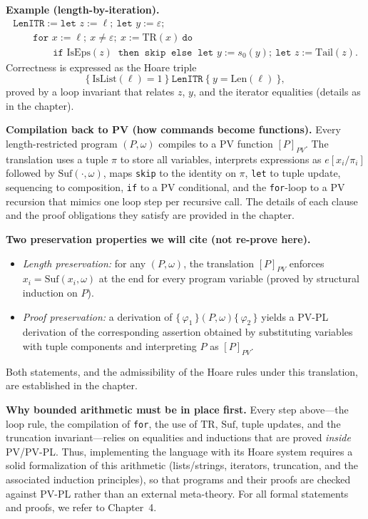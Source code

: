 \medskip
\noindent\textbf{Example (length-by-iteration).}
\[
\begin{array}{l}
\texttt{LenITR} := \texttt{let } z := \ell;\ \texttt{let } y := \varepsilon; \\[0.2em]
\qquad \texttt{for } x := \ell;\ x \neq \varepsilon;\ x := \mathrm{TR}(x)\ \texttt{do } \\
\qquad\qquad \texttt{if } \mathrm{IsEps}(z)\ \texttt{ then }\ \texttt{skip}\ \texttt{ else }\ \texttt{let } y := s_0(y);\ \texttt{let } z := \mathrm{Tail}(z).
\end{array}
\]
Correctness is expressed as the Hoare triple
\[
\{\ \mathrm{IsList}(\ell)=1\ \}\ \texttt{LenITR}\ \{\ y = \mathrm{Len}(\ell)\ \},
\]
proved by a loop invariant that relates \(z\), \(y\), and the iterator equalities (details as in the chapter).


\medskip
\noindent\textbf{Compilation back to PV (how commands become functions).}
Every length-restricted program \((P,\omega)\) compiles to a PV function \([P]_{PV}\).
The translation uses a tuple \(\pi\) to store all variables, interprets expressions as \(e[x_i/\pi_i]\) followed by \(\mathrm{Suf}(\cdot,\omega)\), maps \texttt{skip} to the identity on \(\pi\), \texttt{let} to tuple update, sequencing to composition, \texttt{if} to a PV conditional, and the \texttt{for}-loop to a PV recursion that mimics one loop step per recursive call.
The details of each clause and the proof obligations they satisfy are provided in the chapter.

\medskip
\noindent\textbf{Two preservation properties we will cite (not re-prove here).}
\begin{itemize}
  \item \emph{Length preservation:} for any \((P,\omega)\), the translation \([P]_{PV}\) enforces \(x_i=\mathrm{Suf}(x_i,\omega)\) at the end for every program variable (proved by structural induction on \(P\)).
  \item \emph{Proof preservation:} a derivation of \(\{\,\varphi_1\,\}(P,\omega)\{\,\varphi_2\,\}\) yields a PV-PL derivation of the corresponding assertion obtained by substituting variables with tuple components and interpreting \(P\) as \([P]_{PV}\).
\end{itemize}
Both statements, and the admissibility of the Hoare rules under this translation, are established in the chapter.

\medskip
\noindent\textbf{Why bounded arithmetic must be in place first.}
Every step above---the loop rule, the compilation of \texttt{for}, the use of \(\mathrm{TR}\), \(\mathrm{Suf}\), tuple updates, and the truncation invariant---relies on equalities and inductions that are proved \emph{inside} PV/PV-PL.
Thus, implementing the language with its Hoare system requires a solid formalization of this arithmetic (lists/strings, iterators, truncation, and the associated induction principles), so that programs and their proofs are checked against PV-PL rather than an external meta-theory.
For all formal statements and proofs, we refer to Chapter~4.



